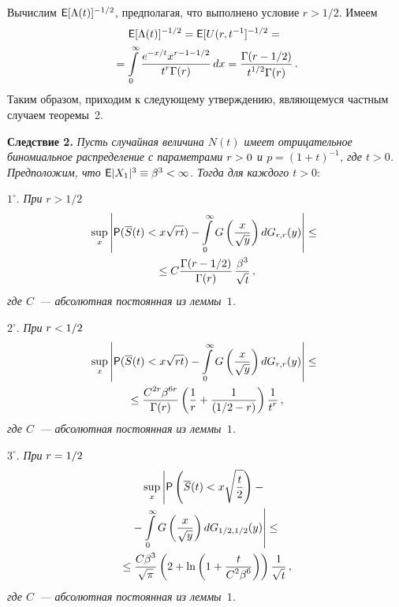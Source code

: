 \begin{multicols}{2}
Вычислим ${\sf E}[\Lambda(t)]^{-1/2}$, предполагая, что выполнено
условие $r>{1}/{2}$. Имеем
\begin{multline*}
{\sf E}[\Lambda(t)]^{-1/2}={\sf
E}[U(r,t^{-1}]^{-1/2}={}\\
{}=\il{0}{\infty}\fr{e^{-x/t}x^{r-1-1/2}}{t^r\Gamma(r)}\,dx
=
\fr{\Gamma(r-{1}/{2})}{t^{1/2}\Gamma(r)}\,.
\end{multline*}
Таким образом, приходим к следующему утверждению, являющемуся
частным случаем теоремы~2.

\smallskip

\noindent
\textbf{Следствие 2.} \textit{Пусть случайная величина $N(t)$ имеет
отрицательное биномиальное распределение с па\-ра\-мет\-ра\-ми $r\hm>0$ и
$p=(1+t)^{-1}$, где $t>0$. Предположим, что ${\sf
E}|X_1|^3\equiv\beta^3<\infty$. Тогда для каждого $t>0:$}

\noindent $1^{\circ}$. \textit{При} $r>1/2$
\begin{multline*}
\sup\limits_x\left\vert {\sf
P}(\overline S(t)<x\sqrt{rt})-\il{0}{\infty}G\left(\fr{x}{\sqrt{y}}\right)dG_{r,r}(y)
\right\vert\le{}\\
{}\le
C\fr{\Gamma(r-{1}/{2})}{\Gamma(r)}\,\fr{\beta^3}{\sqrt{t}}\,,
\end{multline*}
\textit{где $C$~--- абсолютная постоянная из леммы~$1$.}

\noindent $2^{\circ}$. \textit{При} $r\hm<1/2$
\begin{multline*}
\sup\limits_x\left\vert{\sf
P}(\overline
S(t)<x\sqrt{rt})-\il{0}{\infty}G\left(\fr{x}{\sqrt{y}}\right)dG_{r,r}(y)\right\vert\le{}\\
{}\le
\fr{C^{2r}\beta^{6r}}{\Gamma(r)}\left(\fr{1}{r}+\fr{1}{(1/2-r)}\right)
\fr{1}{t^r}\,,
\end{multline*}
\textit{где $C$~--- абсолютная постоянная из леммы~$1$.}

\noindent $3^{\circ}$. \textit{При} $r\hm=1/2$
\begin{multline*}
\sup\limits_x\left\vert{\sf
P}\left(\overline
S(t)<x\sqrt{\fr{t}{2}}\right)-{}\right.\\
\left.{}-\il{0}{\infty}G\left(\fr{x}{\sqrt{y}}\right)
dG_{1/2,1/2}(y)\right\vert\le{}\\
{}\le
\fr{C\beta^3}{\sqrt{\pi}}
\left(2+\ln\left(1+\fr{t}{C^2\beta^6}\right)\right)\fr{1}{\sqrt{t}}\,,
\end{multline*}
\textit{где $C$~--- абсолютная постоянная из леммы~$1$.}

\smallskip


\end{multicols}
